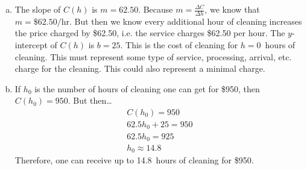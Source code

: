 \documentclass[12pt,letterpaper]{exam}
\begin{document}
\begin{questions}
\begin{enumerate}[(a)]
\item The slope of $C(h)$ is $m= 62.50$. Because $m= \frac{\Delta C}{\Delta h}$, we know that $m= \$62.50/\text{hr}$. But then we know every additional hour of cleaning increases the price charged by \$62.50, i.e. the service charges \$62.50 per hour. The $y$-intercept of $C(h)$ is $b= 25$. This is the cost of cleaning for $h= 0$~hours of cleaning. This must represent some type of service, processing, arrival, etc. charge for the cleaning. This could also represent a minimal charge. \pspace

\item If $h_0$ is the number of hours of cleaning one can get for \$950, then $C(h_0)= 950$. But then\dots
	\[
	\begin{gathered}
	C(h_0)= 950 \\
	62.5h_0 + 25= 950 \\
	62.5h_0= 925 \\
	h_0 \approx 14.8
	\end{gathered}
	\]
Therefore, one can receive up to 14.8~hours of cleaning for \$950. 
\end{enumerate}


\end{questions}
\end{document}
